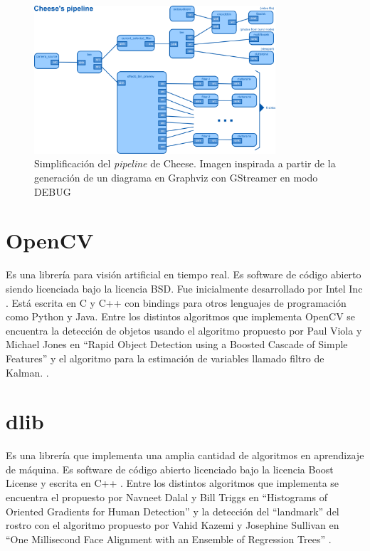 \documentclass[a4paper,openright,12pt]{report}
\begin{document}
\begin{figure}
  \centering
    \includegraphics[angle=90,width=0.8\textwidth]{../images/cheese-pipeline.png}\par
  \caption{Simplificación del \textit{pipeline} de Cheese. Imagen inspirada a
  				 partir de la generación de un diagrama en Graphviz con GStreamer en
  				 modo DEBUG}
\end{figure}

\section{OpenCV}
Es una librería para visión artificial en tiempo real. Es software de código
abierto siendo licenciada bajo la licencia BSD. Fue inicialmente desarrollado
por Intel Inc \cite{openCVAbout}. Está escrita en C y C++ con bindings para
otros lenguajes de programación como Python y Java. Entre los distintos
algoritmos que implementa OpenCV se encuentra la detección de objetos usando
el algoritmo propuesto por Paul Viola y Michael Jones en “Rapid Object Detection
using a Boosted Cascade of Simple Features” y el algoritmo para la estimación de
 variables llamado filtro de Kalman. \cite{openCVAbout}.
\section{dlib}
Es una librería que implementa una amplia cantidad de algoritmos en aprendizaje
de máquina. Es software de código abierto licenciado bajo la
licencia Boost License y escrita en C++ \cite{dlib}\cite{dlibLicense}. Entre
los distintos algoritmos que implementa se encuentra el propuesto por Navneet
Dalal y Bill Triggs en “Histograms of Oriented Gradients for Human Detection”
\cite{dlibHOG} y la detección del “landmark” del rostro con el algoritmo
propuesto por Vahid Kazemi y Josephine Sullivan en “One Millisecond
Face Alignment with an Ensemble of Regression Trees” \cite{dlib1ms}.
\end{document}
